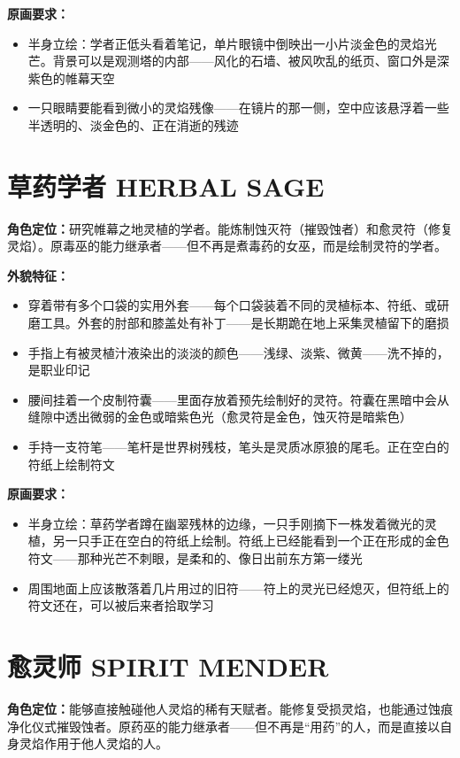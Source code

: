 \documentclass[12pt,a4paper,openany]{ctexbook}
\begin{document}
\textbf{原画要求：}
\begin{itemize}
    \item 半身立绘：学者正低头看着笔记，单片眼镜中倒映出一小片淡金色的灵焰光芒。背景可以是观测塔的内部——风化的石墙、被风吹乱的纸页、窗口外是深紫色的帷幕天空
    \item 一只眼睛要能看到微小的灵焰残像——在镜片的那一侧，空中应该悬浮着一些半透明的、淡金色的、正在消逝的残迹
\end{itemize}

\section{草药学者 HERBAL SAGE}

\textbf{角色定位：}研究帷幕之地灵植的学者。能炼制蚀灭符（摧毁蚀者）和愈灵符（修复灵焰）。原毒巫的能力继承者——但不再是煮毒药的女巫，而是绘制灵符的学者。

\textbf{外貌特征：}
\begin{itemize}
    \item 穿着带有多个口袋的实用外套——每个口袋装着不同的灵植标本、符纸、或研磨工具。外套的肘部和膝盖处有补丁——是长期跪在地上采集灵植留下的磨损
    \item 手指上有被灵植汁液染出的淡淡的颜色——浅绿、淡紫、微黄——洗不掉的，是职业印记
    \item 腰间挂着一个皮制符囊——里面存放着预先绘制好的灵符。符囊在黑暗中会从缝隙中透出微弱的金色或暗紫色光（愈灵符是金色，蚀灭符是暗紫色）
    \item 手持一支符笔——笔杆是世界树残枝，笔头是灵质冰原狼的尾毛。正在空白的符纸上绘制符文
\end{itemize}

\textbf{原画要求：}
\begin{itemize}
    \item 半身立绘：草药学者蹲在幽翠残林的边缘，一只手刚摘下一株发着微光的灵植，另一只手正在空白的符纸上绘制。符纸上已经能看到一个正在形成的金色符文——那种光芒不刺眼，是柔和的、像日出前东方第一缕光
    \item 周围地面上应该散落着几片用过的旧符——符上的灵光已经熄灭，但符纸上的符文还在，可以被后来者拾取学习
\end{itemize}

\section{愈灵师 SPIRIT MENDER}

\textbf{角色定位：}能够直接触碰他人灵焰的稀有天赋者。能修复受损灵焰，也能通过蚀痕净化仪式摧毁蚀者。原药巫的能力继承者——但不再是“用药”的人，而是直接以自身灵焰作用于他人灵焰的人。
\end{document}
